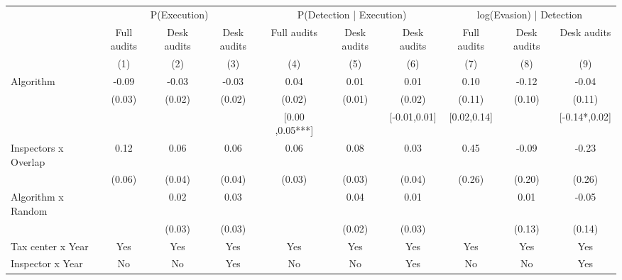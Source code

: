 \begin{tabular}{lccc|ccc|ccc} \toprule
\multicolumn{1}{l}{} & \multicolumn{3}{c}{P(Execution)} & \multicolumn{3}{c}{P(Detection | Execution)} & \multicolumn{3}{c}{log(Evasion) | Detection} \\\cmidrule(lr){2-4}\cmidrule(lr){5-7}\cmidrule(lr){8-10} \multicolumn{1}{l}{} & Full audits & Desk audits & Desk audits & Full audits & Desk audits & Desk audits & Full audits & Desk audits & Desk audits \\ \multicolumn{1}{l}{} & (1) & (2) & (3) & (4) & (5) & (6) & (7) & (8) & (9) \\ \midrule
Algorithm   &       -0.09\sym{***}&       -0.03\sym{*}  &       -0.03\sym{*}  &        0.04\sym{**} &        0.01         &        0.01         &        0.10         &       -0.12         &       -0.04         \\
            &      (0.03)         &      (0.02)         &      (0.02)         &      (0.02)         &      (0.01)         &      (0.02)         &      (0.11)         &      (0.10)         &      (0.11)         \\
\addlinespace
 & & & & [0.00 ,0.05***] & & [-0.01,0.01] & [0.02,0.14] & & [-0.14*,0.02] \\  Inspectors x Overlap&        0.12\sym{*}  &        0.06\sym{*}  &        0.06         &        0.06\sym{*}  &        0.08\sym{**} &        0.03         &        0.45\sym{*}  &       -0.09         &       -0.23         \\
            &      (0.06)         &      (0.04)         &      (0.04)         &      (0.03)         &      (0.03)         &      (0.04)         &      (0.26)         &      (0.20)         &      (0.26)         \\
\addlinespace
Algorithm x Random&                     &        0.02         &        0.03         &                     &        0.04\sym{*}  &        0.01         &                     &        0.01         &       -0.05         \\
            &                     &      (0.03)         &      (0.03)         &                     &      (0.02)         &      (0.03)         &                     &      (0.13)         &      (0.14)         \\
\midrule
Tax center x Year&         Yes         &         Yes         &         Yes         &         Yes         &         Yes         &         Yes         &         Yes         &         Yes         &         Yes         \\
Inspector x Year&          No         &          No         &         Yes         &          No         &          No         &         Yes         &          No         &          No         &         Yes         \\

\end{tabular}
